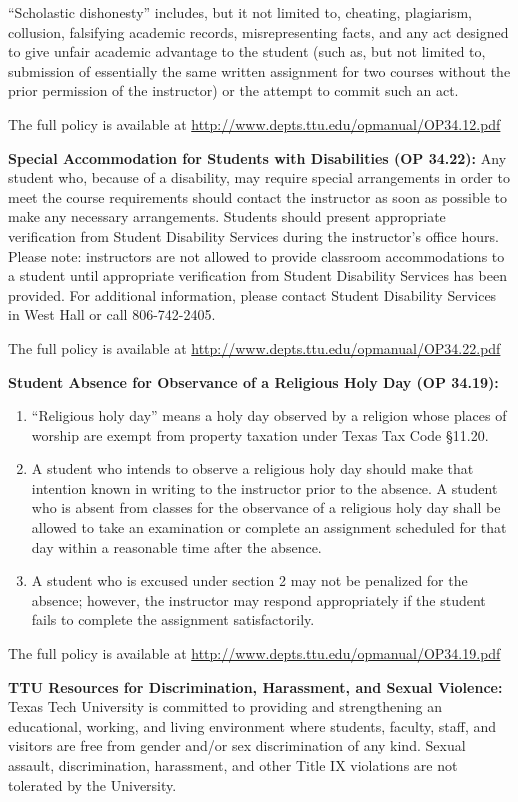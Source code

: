\documentclass[11pt]{NSF}
\def\ben{\begin{enumerate}}
\def\een{\end{enumerate}}
\def\i{\item{}}
\begin{document}
“Scholastic dishonesty” includes, but it not limited to,
cheating, plagiarism, collusion, falsifying academic records,
misrepresenting facts, and any act designed to give unfair academic
advantage to the student (such as, but not limited to, submission of
essentially the same written assignment for two courses without the
prior permission of the instructor) or the attempt to commit such an
act.  

The full policy is available at
\url{http://www.depts.ttu.edu/opmanual/OP34.12.pdf} 

{\bf Special Accommodation for Students with Disabilities 
(OP 34.22):} 
Any student who, because of
a disability, may require special arrangements in order to meet the
course requirements should contact the instructor as soon as possible
to make any necessary arrangements. Students should present
appropriate verification from Student Disability Services during the
instructor's office hours. Please note: instructors are not allowed to
provide classroom accommodations to a student until appropriate
verification from Student Disability Services has been provided. For
additional information, please contact Student Disability Services in
West Hall or call 806-742-2405.  

The full policy is available at
\url{http://www.depts.ttu.edu/opmanual/OP34.22.pdf}

{\bf Student Absence for
Observance of a Religious Holy Day (OP 34.19):}

\ben
\i “Religious holy day”
means a holy day observed by a religion whose places of worship are
exempt from property taxation under Texas Tax Code §11.20.  

\i A student who intends to observe a religious holy day should make that
intention known in writing to the instructor prior to the absence. A
student who is absent from classes for the observance of a religious
holy day shall be allowed to take an examination or complete an
assignment scheduled for that day within a reasonable time after the
absence.  

\i A student who is excused under section 2 may not be
penalized for the absence; however, the instructor may respond
appropriately if the student fails to complete the assignment
satisfactorily.  
\een

The full policy is available at
\url{http://www.depts.ttu.edu/opmanual/OP34.19.pdf}

{\bf TTU Resources for Discrimination, Harassment, and Sexual
Violence:}
Texas Tech University is committed to providing and strengthening an
educational, working, and living environment where students, faculty,
staff, and visitors are free from gender and/or sex discrimination of
any kind. Sexual assault, discrimination, harassment, and other Title
IX violations are not tolerated by the University. 
\end{document}
